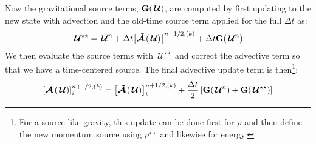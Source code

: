 \documentclass[linenumbers,trackchanges]{aastex631}
\newcommand{\Ub}{\mathbf{U}}
\newcommand{\gb}{\mathbf{g}}
\newcommand{\Uc}{{\,\bm{\mathcal{U}}}}
\newcommand{\ex}{{\bf e}_x}
\newcommand{\Gb}{{\bf G}}
\newcommand{\Adv}[1]{{\left [\boldsymbol{\mathcal{A}} \left(#1\right)\right]}}
\newcommand{\Advt}[1]{{\left [\boldsymbol{\mathcal{\tilde{A}}} \left(#1\right)\right]}}
\begin{document}
\begin{itemize}
\begin{itemize}
\begin{itemize}
    Now the gravitational source terms, $\Gb(\Uc)$, are computed by first updating to the
    new state with advection and the old-time source term applied for the full $\Delta t$ as:
    \begin{equation}
      \Uc^{\star\star} = \Uc^n + \Delta t \Advt{\Uc}^{n+1/2,(k)} + \Delta t \Gb(\Uc^n)\label{eq:grav_pred}
    \end{equation}
    We then evaluate the source terms with $\Uc^{\star\star}$ and
    correct the advective term so that we have a time-centered
    source.
    The final advective update term is then\footnote{For a source like gravity, this update can be done first for $\rho$ and then define the new momentum source using $\rho^{\star\star}$ and likewise for energy.}:
    \begin{equation}
      \Adv{\Uc}^{n+1/2,(k)}_{i} = \Advt{\Uc}^{n+1/2,(k)}_{i} +
      \frac{\Delta t}{2} \left [\Gb(\Uc^n) + \Gb(\Uc^{\star\star}) \right ]\label{eq:grav_corr}
    \end{equation}



\end{itemize}
\end{itemize}
\end{itemize}
\end{document}
